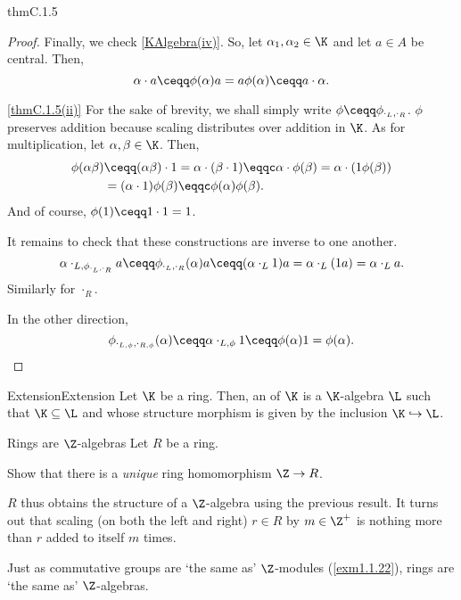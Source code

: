 \begin{thm}{}{thmC.1.5}
\begin{proof}
		Finally, we check \cref{KAlgebra(iv)}.  So, let $\alpha _1,\alpha _2\in \K$ and let $a\in A$ be central.  Then,
		\begin{equation}
			\alpha \cdot a\ceqq \phi (\alpha )a=a\phi (\alpha )\ceqq a\cdot \alpha .
		\end{equation}
		
		\blni
		\cref{thmC.1.5(ii)} For the sake of brevity, we shall simply write $\phi \ceqq \phi _{\cdot _L,\cdot _R}$.  $\phi$ preserves addition because scaling distributes over addition in $\K$.  As for multiplication, let $\alpha ,\beta \in \K$.  Then,
		\begin{equation}
			\begin{split}
				\phi (\alpha \beta ) & \ceqq (\alpha \beta )\cdot 1=\alpha \cdot (\beta \cdot 1)\eqqc \alpha \cdot \phi (\beta )=\alpha \cdot (1\phi (\beta )) \\
				& =(\alpha \cdot 1)\phi (\beta )\eqqc \phi (\alpha )\phi (\beta ).
			\end{split}
		\end{equation}
		And of course, $\phi (1)\ceqq 1\cdot 1=1$.
		
		\blni
		It remains to check that these constructions are inverse to one another.
		\begin{equation}
			\alpha \cdot _{L,\phi _{\cdot _L,\cdot _R}}a\ceqq \phi _{\cdot _L,\cdot _R}(\alpha )a\ceqq (\alpha \cdot _L1)a=\alpha \cdot _L(1a)=\alpha \cdot _La.
		\end{equation}
		Similarly for $\cdot _R$.
		
		In the other direction,
		\begin{equation}
			\phi _{\cdot _{L,\phi},\cdot _{R,\phi}}(\alpha )\ceqq \alpha \cdot _{L,\phi}1\ceqq \phi (\alpha )1=\phi (\alpha ).
		\end{equation}
	\end{proof}
\end{thm}
\begin{dfn}{Extension}{Extension}
	Let $\K$ be a ring.  Then, an  of $\K$ is a $\K$-algebra $\L$ such that $\K \subseteq \L$ and whose structure morphism is given by the inclusion $\K \hookrightarrow \L$.
\end{dfn}
\begin{exm}{Rings are $\Z$-algebras}{}
	Let $R$ be a ring.
	\begin{exr}[breakable=false]{}{}
		Show that there is a \emph{unique} ring homomorphism $\Z \rightarrow R$.
	\end{exr}
	$R$ thus obtains the structure of a $\Z$-algebra using the previous result.  It turns out that scaling (on both the left and right) $r\in R$ by $m\in \Z ^+$ is nothing more than $r$ added to itself $m$ times.
	
	\begin{rmk}
		Just as commutative groups are `the same as' $\Z$-modules (\cref{exm1.1.22}), rings are `the same as' $\Z$-algebras.
	\end{rmk}
\end{exm}
